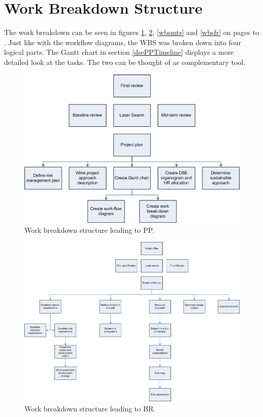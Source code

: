 \section{Work Breakdown Structure}
\label{dsePPWBS}
The work breakdown can be seen in figures \ref{wbspp}, \ref{wbsbr}, \ref{wbsmtr} and \ref{wbsfr} on pages \pageref{wbspp} to \pageref{wbsfr}. Just like with the workflow diagrams, the WBS was broken down into four logical parts. The Gantt chart in section \ref{dsePPTimeline} displays a more detailed look at the tasks. The two can be thought of as complementary tool.\cite[Table 11-33, page 410]{larson}

\begin{figure} [H]
\begin{center}
\includegraphics[width=1.0\textwidth, angle=0]{chapters/img/Work_break_down_structure_PP.jpg}
\end{center}
\caption{Work breakdown structure leading to PP.}
\label{wbspp}
\end{figure}
\begin{figure} [H]
\begin{center}
\includegraphics[width=1.0\textwidth, angle=0]{chapters/img/Work_break_down_structure_BR.jpg}
\end{center}
\caption{Work breakdown structure leading to BR.}
\label{wbsbr}
\end{figure}
